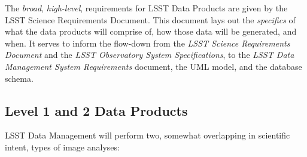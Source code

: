 \documentclass[12pt]{article}
\begin{document}
\vspace{1em}

The {\em broad}, {\em high-level}, requirements for LSST Data Products are given by the LSST Science Requirements Document. This document lays out the {\em specifics} of what the data products will comprise of, how those data will be generated, and when. It serves to inform the flow-down from the {\em LSST Science Requirements Document} and the {\em LSST Observatory System Specifications}, to the {\em LSST Data Management System Requirements} document, the UML model, and the database schema.

\subsection{Level 1 and 2 Data Products}

LSST Data Management will perform two, somewhat overlapping in scientific intent, types of image analyses:
\end{document}
